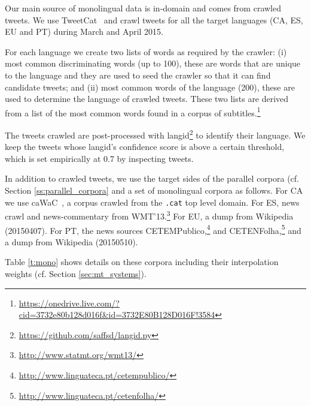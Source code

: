 \documentclass[postprint]{flammie}
\begin{document}

Our main source of monolingual data is in-domain and comes from crawled tweets.
We use TweetCat~\cite{ljubesic14-tweetcat} and crawl tweets for all the target languages (CA, ES, EU and PT) during March and April 2015.

For each language we create two lists of words as required by the crawler:
(i) most common discriminating words (up to 100), these are words that are unique to the language and they are used to seed the crawler so that it can find candidate tweets;
and (ii) most common words of the language (200), these are used to determine the language of crawled tweets.
These two lists are derived from a list of the most common words found in a corpus of subtitles.\footnote{\url{https://onedrive.live.com/?cid=3732e80b128d016f&id=3732E80B128D016F!3584}}

The tweets crawled are post-processed with langid\footnote{\url{https://github.com/saffsd/langid.py}} to identify their language.
We keep the tweets whose langid's confidence score is above a certain threshold, which is set empirically at 0.7 by inspecting tweets.

In addition to crawled tweets, we use the target sides of the parallel corpora (cf. Section \ref{ss:parallel_corpora} and a set of monolingual corpora as follows.
For CA we use caWaC~\cite{LJUBEI14.841}, a corpus crawled from the \texttt{.cat} top level domain.
For ES, news crawl and news-commentary from WMT'13.\footnote{\url{http://www.statmt.org/wmt13/}}
For EU, a dump from Wikipedia (20150407).
For PT, the news sources CETEMPublico,\footnote{\url{http://www.linguateca.pt/cetempublico/}} and CETENFolha,\footnote{\url{http://www.linguateca.pt/cetenfolha/}} and a dump from Wikipedia (20150510).

Table \ref{t:mono} shows details on these corpora including their interpolation weights (cf. Section \ref{sec:mt_systems}).



\end{document}

